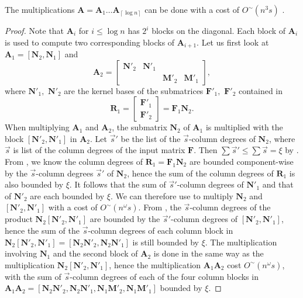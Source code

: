 \begin{lem}
The multiplications $\mathbf{A}=\mathbf{A}_{1}\dots\mathbf{A}_{\left\lceil \log n\right\rceil }$
can be done with a cost of $O^{\sim}(n^{3}s)$ .\end{lem}
\begin{proof}
Note that $\mathbf{A}_{i}$ for $i\le\log n$ has $2^{i}$ blocks
on the diagonal. Each block of $\mathbf{A}_{i}$ is used to compute
two corresponding blocks of $\mathbf{A}_{i+1}$. Let us first look
at $\mathbf{A}_{1}=\left[\mathbf{N}_{2},\mathbf{N}_{1}\right]$ and
\[
\mathbf{A}_{2}=\begin{bmatrix}\mathbf{N}'_{2} & \mathbf{N}'_{1}\\
 &  & \mathbf{M}'_{2} & \mathbf{M}'_{1}
\end{bmatrix},
\]
 where $\mathbf{N}'_{1},$ $\mathbf{N}'_{2}$ are the kernel bases
of the submatrices $\mathbf{F}'_{1},$ $\mathbf{F}'_{2}$ contained
in 
\[
\mathbf{R}_{1}=\begin{bmatrix}\mathbf{F}'_{1}\\
\mathbf{F}'_{2}
\end{bmatrix}=\mathbf{F}_{1}\mathbf{N}_{2}.
\]
 When multiplying $\mathbf{A}_{1}$ and $\mathbf{A}_{2}$, the submatrix
$\mathbf{N}_{2}$ of $\mathbf{A}_{1}$ is multiplied with the block
$\left[\mathbf{N}'_{2},\mathbf{N}'_{1}\right]$ in $\mathbf{A}_{2}$.
Let $\vec{s}'$ be the list of the $\vec{s}$-column degrees of $\mathbf{N}_{2}$,
where $\vec{s}$ is list of the column degrees of the input matrix
$\mathbf{F}$. Then $\sum\vec{s}'\le\sum\vec{s}=\xi$ by .
From , we know the column degrees
of $\mathbf{R}_{1}=\mathbf{F}_{1}\mathbf{N}_{2}$ are bounded component-wise
by the $\vec{s}$-column degrees $\vec{s}'$ of $\mathbf{N}_{2}$,
hence the sum of the column degrees of $\mathbf{R}_{1}$ is also bounded
by $\xi$. It follows that the sum of $\vec{s}'$-column degrees of
$\mathbf{N}'_{1}$ and that of $\mathbf{N}'_{2}$ are each bounded
by $\xi$. We can therefore use 
to multiply $\mathbf{N}_{2}$ and $\left[\mathbf{N}'_{2},\mathbf{N}'_{1}\right]$
with a cost of $O^{\sim}\left(n^{\omega}s\right)$. From ,
the $\vec{s}$-column degrees of the product $\mathbf{N}_{2}\left[\mathbf{N}'_{2},\mathbf{N}'_{1}\right]$
are bounded by the $\vec{s}'$-column degrees of $\left[\mathbf{N}'_{2},\mathbf{N}'_{1}\right]$,
hence the sum of the $\vec{s}$-column degrees of each column block
in $\mathbf{N}_{2}\left[\mathbf{N}'_{2},\mathbf{N}'_{1}\right]=\left[\mathbf{N}_{2}\mathbf{N}'_{2},\mathbf{N}_{2}\mathbf{N}'_{1}\right]$
is still bounded by $\xi$. The multiplication involving $\mathbf{N}_{1}$
and the second block of $\mathbf{A}_{2}$ is done in the same way
as the multiplication $\mathbf{N}_{2}\left[\mathbf{N}'_{2},\mathbf{N}'_{1}\right]$,
hence the multiplication $\mathbf{A}_{1}\mathbf{A}_{2}$ cost $O^{\sim}\left(n^{\omega}s\right)$,
with the sum of $\vec{s}$-column degrees of each of the four column
blocks in $\mathbf{A}_{1}\mathbf{A}_{2}=\left[\mathbf{N}_{2}\mathbf{N}'_{2},\mathbf{N}_{2}\mathbf{N}'_{1},\mathbf{N}_{1}\mathbf{M}'_{2},\mathbf{N}_{1}\mathbf{M}'_{1}\right]$
bounded by $\xi$.


\end{proof}
